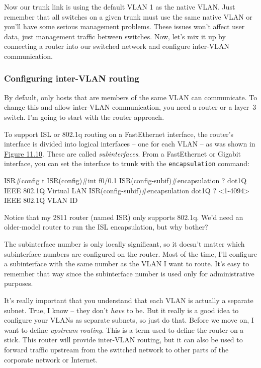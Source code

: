 Now our trunk link is
using the default VLAN 1 as the native VLAN. Just remember that all
switches on a given trunk must use the same native VLAN or you'll have
some serious management problems. These issues won't affect user data,
just management traffic between switches. Now, let's mix it up by
connecting a router into our switched network and configure inter-VLAN
communication.

\subsubsection{Configuring inter-VLAN routing}

By default, only hosts that are members of the same VLAN can
communicate. To change this and allow inter-VLAN communication, you need
a router or a layer~3 switch. I'm going to start with the router
approach.

To support ISL or 802.1q routing on a FastEthernet interface, the
router's interface is divided into logical interfaces -- one for each
VLAN -- as was shown in
\protect\hyperlink{c11.xhtmlux5cux23figure11-10}{Figure 11.10}. These
are called \emph{subinterfaces}. From a FastEthernet or Gigabit
interface, you can set the interface to trunk with the
\texttt{encapsulation} command:

\begin{cli}
ISR#config t
ISR(config)#int f0/0.1
ISR(config-subif)#encapsulation ?
  dot1Q  IEEE 802.1Q Virtual LAN
ISR(config-subif)#encapsulation dot1Q ?
  <1-4094>  IEEE 802.1Q VLAN ID
\end{cli}

Notice that my 2811 router (named ISR) only supports 802.1q. We'd need
an older-model router to run the ISL encapsulation, but why bother?

The subinterface number is only locally significant, so it doesn't
matter which subinterface numbers are configured on the router. Most of
the time, I'll configure a subinterface with the same number as the VLAN
I want to route. It's easy to remember that way since the subinterface
number is used only for administrative purposes.

It's really important that you understand that each VLAN is actually a
separate subnet. True, I know -- they don't \emph{have} to be. But it
really is a good idea to configure your VLANs as separate subnets, so
just do that. Before we move on, I want to define \emph{upstream
routing}. This is a term used to define the router-on-a-stick. This
router will provide inter-VLAN routing, but it can also be used to
forward traffic upstream from the switched network to other parts of the
corporate network or Internet.

